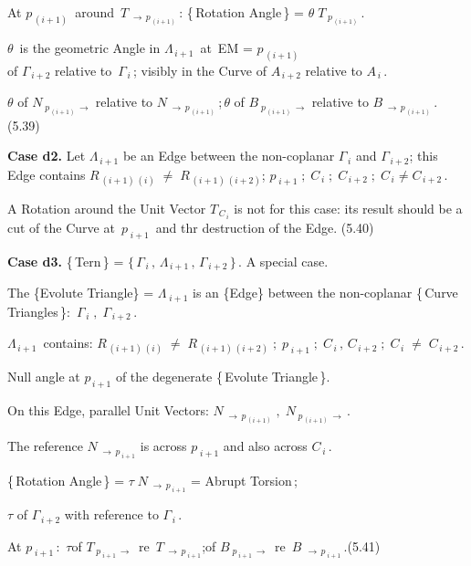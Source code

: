 \documentclass[12pt]{article} %
\begin{document}
{\noindent At $p_{\,(i+1)}$\, around \,$T_{\;\to\,p_{\,(i+1)}}$\,: \;
\{\,Rotation Angle\,\} = $\theta\;T_{\;p_{\,(i+1)}}$\,. \qquad 

\noindent $\theta$\, is the geometric Angle in $\Lambda_{\,i+1}$
\,at \,EM = $p_{\,(i+1)}$\\ of $\Gamma_{\,i+2}$ relative to\, $\Gamma_{\,i}$\,; visibly in the Curve of $A_{\,i+2}$ relative to $A_{\,i}$\,.
 
\noindent $\theta$ of $N_{\;p_{\,(i+1)}\,\to}$ relative to $N_{\;\to\,p_{\,(i+1)}}$\;\,;\,\;$\theta$ of $B_{\;p_{\,(i+1)}\,\to}$ relative to $B_{\;\to\,p_{\,(i+1)}}$\,. (5.39) 

\noindent \textbf{Case d2.} Let $\Lambda_{\,i+1}$ be an Edge between the non-coplanar $\Gamma_{\,i}$ and $\Gamma_{\,i+2}$; this Edge contains\; $R_{\,(i+1)\,(i)}\;\neq\;R_{\,(i+1)\,(i+2)}$\;;\; $p_{\;i+1}\;;\;C_{\,i}\;;\;C_{\,i+2}\;;\;C_{\,i} \neq C_{\,i+2}$\,. 

\noindent A Rotation around the Unit Vector $T_{\,C_{\,i}}$ is not for this case: its result should be a cut of the Curve at\, $p_{\;i+1}$\, and thr destruction of the Edge. \qquad (5.40)

\noindent \textbf{Case d3.} \{\,Tern\,\} = $\big\{\,\Gamma_{\,i}\,,\,\Lambda_{\,i+1}\,,\,\Gamma_{\,i+2}\,\big\}$\,. A special case.

\noindent The \{Evolute Triangle\} = $\Lambda_{\;i+1}$ is an \{Edge\} between the non-coplanar \{\,Curve Triangles\,\}:\, $\Gamma_{\,i}\;,\;\Gamma_{\,i+2}$\,.

\noindent $\Lambda_{\,i+1}$\, contains: $R_{\,(i+1)\,(i)}\;\neq\;R_{\,(i+1)\,(i+2)}\;;\;p_{\;i+1}\;;\;C_{\,i}\,,\,C_{\,i+2}\;;\;C_{\,i}\;\neq\;C_{\,i+2}$\,.

\noindent Null angle at $p_{\,i+1}$ of the degenerate \{\,Evolute Triangle\,\}.

\noindent On this Edge, parallel Unit Vectors: \; $N_{\;\to\,p_{\,(i+1)}}\;,\;N_{\;p_{\,(i+1)}\,\to}$\,.

\noindent The reference $N_{\;\to\,p_{\;i+1}}$ is across $p_{\;i+1}$ and also across $C_{\,i}$\,.

\noindent\{\,Rotation Angle\,\} = $\tau\;N_{\;\to\,p_{\;i+1}}$ = Abrupt Torsion\,;

\noindent $\tau$ of $\Gamma_{\,i+2}$ with reference to $\Gamma_{\,i}$\,.

\noindent At $p_{\;i+1}$\,: \,$\tau$\quad of \quad $T_{\;p_{\;i+1}\,\to}$\, re \,$T_{\;\to\,p_{\;i+1}}$\;;\quad of \quad $B_{\;p_{\;i+1}\,\to}$\, re \,$B_{\;\,\to\,p_{\;i+1}}$\,.\quad (5.41)

}
\end{document}
